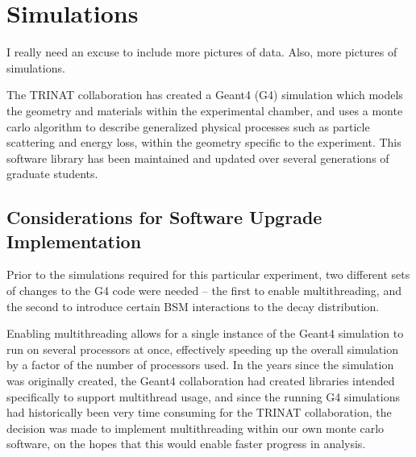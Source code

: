 % 
% 
% 
% 
\chapter{Simulations}
\label{simulations_chapter}

I really need an excuse to include more pictures of data.  Also, more pictures of simulations.


The TRINAT collaboration has created a Geant4 (G4) simulation which models the geometry and materials within the experimental chamber, and uses a monte carlo algorithm to describe generalized physical processes such as particle scattering and energy loss, within the geometry specific to the experiment.  This software library has been maintained and updated over several generations of graduate students.  

\section{Considerations for Software Upgrade Implementation}
\label{sec:software_upgrades}
Prior to the simulations required for this particular experiment, two different sets of changes to the G4 code were needed -- the first to enable multithreading, and the second to introduce certain BSM interactions to the decay distribution.  

Enabling multithreading allows for a single instance of the Geant4 simulation to run on several processors at once, effectively speeding up the overall simulation by a factor of the number of processors used.  In the years since the simulation was originally created, the Geant4 collaboration had created libraries intended specifically to support multithread usage, and since the running G4 simulations had historically been very time consuming for the TRINAT collaboration, the decision was made to implement multithreading within our own monte carlo software, on the hopes that this would enable faster progress in analysis. 

